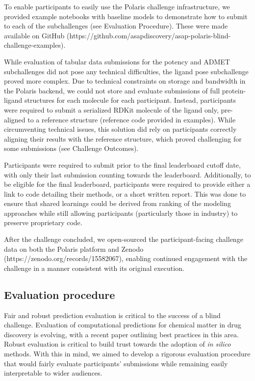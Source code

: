 \documentclass[journal=jcim,manuscript=article]{achemso}
\begin{document}
To enable participants to easily use the Polaris challenge infrastructure, we provided example notebooks with baseline models to demonstrate how to submit to each of the subchallenges (see Evaluation Procedure). These were made available on GitHub (https://github.com/asapdiscovery/asap-polaris-blind-challenge-examples). 

While evaluation of tabular data submissions for the potency and ADMET subchallenges did not pose any technical difficulties, the ligand pose subchallenge proved more complex. Due to technical constraints on storage and bandwidth in the Polaris backend, we could not store and evaluate submissions of full protein-ligand structures for each molecule for each participant. Instead, participants were required to submit a serialized RDKit molecule of the ligand only, pre-aligned to a reference structure (reference code provided in examples). While circumventing technical issues, this solution did rely on participants correctly aligning their results with the reference structure, which proved challenging for some submissions (see Challenge Outcomes).

Participants were required to submit prior to the final leaderboard cutoff date, with only their last submission counting towards the leaderboard. Additionally, to be eligible for the final leaderboard, participants were required to provide either a link to code detailing their methods, or a short written report. This was done to ensure that shared learnings could be derived from ranking of the modeling approaches while still allowing participants (particularly those in industry) to preserve proprietary code. 

After the challenge concluded, we open-sourced the participant-facing challenge data on both the Polaris platform and Zenodo (https://zenodo.org/records/15582067), enabling continued engagement with the challenge in a manner consistent with its original execution.


\subsection{Evaluation procedure}    

Fair and robust prediction evaluation is critical to the success of a blind challenge\cite{sampl6_2018}. Evaluation of computational predictions for chemical matter in drug discovery is evolving, with a recent paper outlining best practices in this area\cite{ash_practically_2024}. Robust evaluation is critical to build trust towards the adoption of \textit{in silico} methods. With this in mind, we aimed to develop a rigorous evaluation procedure that would fairly evaluate participants' submissions while remaining easily interpretable to wider audiences.
\end{document}
